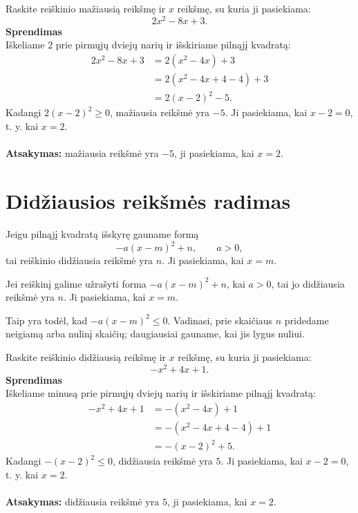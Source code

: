 \documentclass[11pt,a4paper]{scrartcl}
\begin{document}
\begin{example}
Raskite reiškinio mažiausią reikšmę ir $x$ reikšmę, su kuria ji pasiekiama:
\[
2x^2-8x+3.
\]
\textbf{Sprendimas}\\
Iškeliame $2$ prie pirmųjų dviejų narių ir išskiriame pilnąjį kvadratą:
\[
\begin{aligned}
2x^2-8x+3
&=2(x^2-4x)+3\\
&=2(x^2-4x+4-4)+3\\
&=2(x-2)^2-5.
\end{aligned}
\]
Kadangi $2(x-2)^2\geq0$, mažiausia reikšmė yra $-5$. Ji pasiekiama, kai $x-2=0$, t. y. kai $x=2$.\\ \\
\textbf{Atsakymas:} mažiausia reikšmė yra $-5$, ji pasiekiama, kai $x=2$.
\end{example}

\section{Didžiausios reikšmės radimas}

Jeigu pilnąjį kvadratą išskyrę gauname formą
\[
-a(x-m)^2+n, \qquad a>0,
\]
tai reiškinio didžiausia reikšmė yra $n$. Ji pasiekiama, kai $x=m$.

\begin{property}
Jei reiškinį galime užrašyti forma $-a(x-m)^2+n$, kai $a>0$, tai jo didžiausia reikšmė yra $n$. Ji pasiekiama, kai $x=m$.
\end{property}

Taip yra todėl, kad $-a(x-m)^2\leq0$. Vadinasi, prie skaičiaus $n$ pridedame neigiamą arba nulinį skaičių; daugiausiai gauname, kai jis lygus nuliui.

\begin{example}
Raskite reiškinio didžiausią reikšmę ir $x$ reikšmę, su kuria ji pasiekiama:
\[
-x^2+4x+1.
\]
\textbf{Sprendimas}\\
Iškeliame minusą prie pirmųjų dviejų narių ir išskiriame pilnąjį kvadratą:
\[
\begin{aligned}
-x^2+4x+1
&=-(x^2-4x)+1\\
&=-(x^2-4x+4-4)+1\\
&=-(x-2)^2+5.
\end{aligned}
\]
Kadangi $-(x-2)^2\leq0$, didžiausia reikšmė yra $5$. Ji pasiekiama, kai $x-2=0$, t. y. kai $x=2$.\\ \\
\textbf{Atsakymas:} didžiausia reikšmė yra $5$, ji pasiekiama, kai $x=2$.
\end{example}
\end{document}
